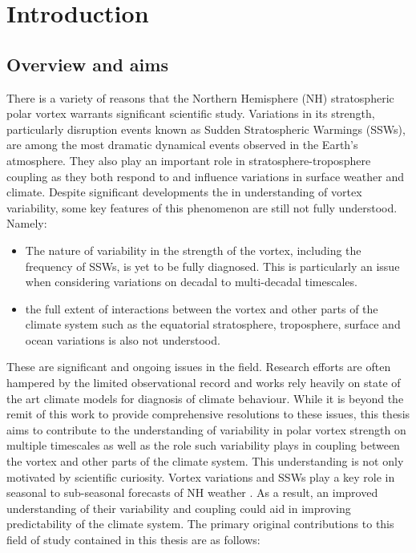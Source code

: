\chapter{Introduction}
\label{cha:intro}

\section{Overview and aims}
\label{sec:overview}

There is a variety of reasons that the Northern Hemisphere (NH) stratospheric polar vortex warrants significant scientific study. Variations in its strength, particularly disruption events known as Sudden Stratospheric Warmings (SSWs), are among the most dramatic dynamical events observed in the Earth's atmosphere. They also play an important role in stratosphere-troposphere coupling as they both respond to and influence variations in surface weather and climate. Despite significant developments the in understanding of vortex variability, some key features of this phenomenon are still not fully understood. Namely: 

\begin{itemize}
    \item The nature of variability in the strength of the vortex, including the frequency of SSWs, is yet to be fully diagnosed. This is particularly an issue when considering variations on decadal to multi-decadal timescales.  
    
    \item the full extent of interactions between the vortex and other parts of the climate system such as the equatorial stratosphere, troposphere, surface and ocean variations is also not understood. 
\end{itemize}

These are significant and ongoing issues in the field. Research efforts are often hampered by the limited observational record and works rely heavily on state of the art climate models for diagnosis of climate behaviour. While it is beyond the remit of this work to provide comprehensive resolutions to these issues, this thesis aims to contribute to the understanding of variability in polar vortex strength on multiple timescales as well as the role such variability plays in coupling between the vortex and other parts of the climate system. This understanding is not only motivated by scientific curiosity. Vortex variations and SSWs play a key role in seasonal to sub-seasonal forecasts of NH weather \citep{scaifeSeasonal2016}. As a result, an improved understanding of their variability and coupling could aid in improving predictability of the climate system. The primary original contributions to this field of study contained in this thesis are as follows:

